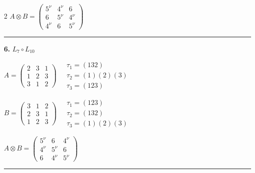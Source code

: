 \begin{multicols}{2}
$A \otimes B = \begin{pmatrix} 5^\nu & 4^\nu & 6 \\ 6 & 5^\nu & 4^\nu \\ 4^\nu & 6 & 5^\nu \end{pmatrix}$

\vspace{0.3em}
\hrule
\vspace{0.3em}

\noindent\textbf{6.} $L_{7} \circ L_{10}$

$A = \begin{pmatrix} 2 & 3 & 1 \\ 1 & 2 & 3 \\ 3 & 1 & 2 \end{pmatrix} \quad \begin{matrix} \tau_{1}=(1 3 2) \\ \tau_{2}=(1)(2)(3) \\ \tau_{3}=(1 2 3) \end{matrix}$

$B = \begin{pmatrix} 3 & 1 & 2 \\ 2 & 3 & 1 \\ 1 & 2 & 3 \end{pmatrix} \quad \begin{matrix} \tau_{1}=(1 2 3) \\ \tau_{2}=(1 3 2) \\ \tau_{3}=(1)(2)(3) \end{matrix}$

$A \otimes B = \begin{pmatrix} 5^\nu & 6 & 4^\nu \\ 4^\nu & 5^\nu & 6 \\ 6 & 4^\nu & 5^\nu \end{pmatrix}$

\vspace{0.3em}
\hrule
\vspace{0.3em}

\end{multicols}